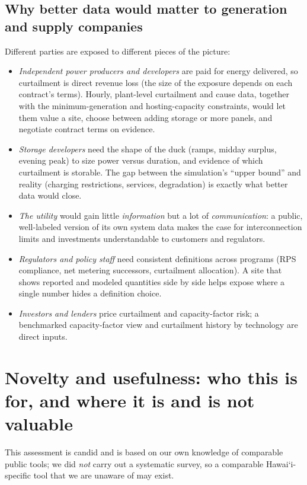 \documentclass[11pt,a4paper]{article}
\newcommand{\okina}{\textquoteleft}
\newcommand{\Hawaii}{\texorpdfstring{Hawai\okina i}{Hawaii}}
\begin{document}
\subsection{Why better data would matter to generation and supply companies}
Different parties are exposed to different pieces of the picture:
\begin{itemize}
\item \emph{Independent power producers and developers} are paid for energy delivered, so curtailment is direct
 revenue loss (the size of the exposure depends on each contract's terms). Hourly, plant-level curtailment and
 cause data, together with the minimum-generation and hosting-capacity constraints, would let them value a site,
 choose between adding storage or more panels, and negotiate contract terms on evidence.
\item \emph{Storage developers} need the shape of the duck (ramps, midday surplus, evening peak) to size power
 versus duration, and evidence of which curtailment is storable. The gap between the simulation's ``upper
 bound'' and reality (charging restrictions, services, degradation) is exactly what better data would close.
\item \emph{The utility} would gain little \emph{information} but a lot of \emph{communication}: a public,
 well-labeled version of its own system data makes the case for interconnection limits and investments
 understandable to customers and regulators.
\item \emph{Regulators and policy staff} need consistent definitions across programs (RPS compliance, net metering
 successors, curtailment allocation). A site that shows reported and modeled quantities side by side helps expose where a
 single number hides a definition choice.
\item \emph{Investors and lenders} price curtailment and capacity-factor risk; a benchmarked capacity-factor view
 and curtailment history by technology are direct inputs.
\end{itemize}

\section{Novelty and usefulness: who this is for, and where it is and is not valuable}
\label{sec:novelty}

This assessment is candid and is based on our own knowledge of comparable public tools; we did \emph{not} carry
out a systematic survey, so a comparable \Hawaii-specific tool that we are unaware of may exist.
\end{document}
